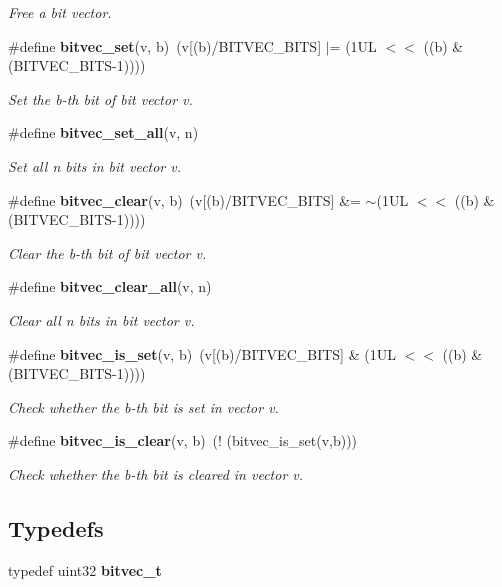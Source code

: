 \begin{CompactItemize}
\begin{CompactList}\small\item\em Free a bit vector. \item\end{CompactList}\item 
\#define {\bf bitvec\_\-set}(v, b)~(v[(b)/BITVEC\_\-BITS] $|$= (1UL $<$$<$ ((b) \& (BITVEC\_\-BITS-1))))
\begin{CompactList}\small\item\em Set the b-th bit of bit vector v. \item\end{CompactList}\item 
\#define {\bf bitvec\_\-set\_\-all}(v, n)
\begin{CompactList}\small\item\em Set all n bits in bit vector v. \item\end{CompactList}\item 
\#define {\bf bitvec\_\-clear}(v, b)~(v[(b)/BITVEC\_\-BITS] \&= $\sim$(1UL $<$$<$ ((b) \& (BITVEC\_\-BITS-1))))
\begin{CompactList}\small\item\em Clear the b-th bit of bit vector v. \item\end{CompactList}\item 
\#define {\bf bitvec\_\-clear\_\-all}(v, n)
\begin{CompactList}\small\item\em Clear all n bits in bit vector v. \item\end{CompactList}\item 
\#define {\bf bitvec\_\-is\_\-set}(v, b)~(v[(b)/BITVEC\_\-BITS] \& (1UL $<$$<$ ((b) \& (BITVEC\_\-BITS-1))))
\begin{CompactList}\small\item\em Check whether the b-th bit is set in vector v. \item\end{CompactList}\item 
\#define {\bf bitvec\_\-is\_\-clear}(v, b)~(! (bitvec\_\-is\_\-set(v,b)))
\begin{CompactList}\small\item\em Check whether the b-th bit is cleared in vector v. \item\end{CompactList}\end{CompactItemize}
\subsection*{Typedefs}
\begin{CompactItemize}
\item 
typedef uint32 \textbf{bitvec\_\-t}\label{bitvec_8h_de0d20aa7e2ccec4e6fcf06419251f71}

\end{CompactItemize}

